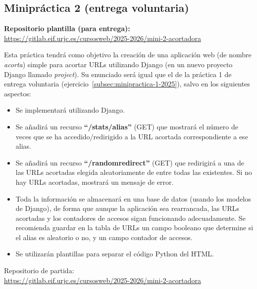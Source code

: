 \subsection{Minipráctica 2 (entrega voluntaria)}
\label{subsec:minipractica-2-2025}

\textbf{Repositorio plantilla (para entrega):} \\
\url{https://gitlab.eif.urjc.es/cursosweb/2025-2026/mini-2-acortadora}

Esta práctica tendrá como objetivo la creación de una aplicación web (de nombre \emph{acorta}) simple para acortar URLs utilizando Django (en un nuevo proyecto Django llamado \emph{project}). Su enunciado será igual que el de la práctica 1 de entrega voluntaria (ejercicio~\ref{subsec:minipractica-1-2025}), salvo en los siguientes aspectos:

\begin{itemize}
  \item Se implementará utilizando Django.

  \item Se añadirá un recurso \textbf{``/stats/alias''} (GET) que mostrará el número de veces que se ha accedido/redirigido a la URL acortada correspondiente a ese alias.

  \item Se añadirá un recurso \textbf{``/randomredirect''} (GET) que redirigirá a una de las URLs acortadas elegida aleatoriamente de entre todas las existentes. Si no hay URLs acortadas, mostrará un mensaje de error.

  \item Toda la información se almacenará en una base de datos (usando los modelos de Django), de forma que aunque la aplicación sea rearrancada, las URLs acortadas y los contadores de accesos sigan funcionando adecuadamente. Se recomienda guardar en la tabla de URLs un campo booleano que determine si el alias es aleatorio o no, y un campo contador de accesos.

  \item Se utilizarán plantillas para separar el código Python del HTML.
\end{itemize}

Repositorio de partida: \\
\url{https://gitlab.eif.urjc.es/cursosweb/2025-2026/mini-2-acortadora}



